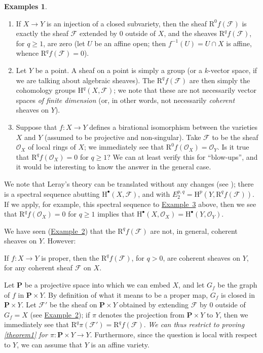 \documentclass{article}
\theoremstyle{plain}
\newenvironment{theorem}[1]
    {\renewcommand\theinnercustomtheorem{#1}\innercustomtheorem}
    {\endinnercustomtheorem}
\theoremstyle{definition}
\newtheorem*{examples}{Examples}
\newcommand{\sh}{\mathscr}
\newcommand{\HH}{\mathrm{H}}
\newcommand{\RR}{\mathrm{R}}
\newcommand{\PP}{\mathbf{P}}
\renewcommand{\geq}{\geqslant}
\newcommand{\oldpage}[1]{\marginpar{\footnotesize$\Big\vert$ \textit{p.~#1}}}
\begin{document}
\begin{examples}
  \begin{enumerate}
    \item If $X\to Y$ is an injection of a closed subvariety, then the sheaf $\RR^0f(\sh{F})$ is exactly the sheaf $\sh{F}$ extended by $0$ outside of $X$, and the sheaves $\RR^qf(\sh{F})$, for $q\geq1$, are zero (let $U$ be an affine open; then $f^{-1}(U)=U\cap X$ is affine, whence $\RR^qf(\sh{F})=0$).
      \label{example1}
    \item Let $Y$ be a point.
      A sheaf on a point is simply a group (or a $k$-vector space, if we are talking about algebraic sheaves).
      The $\RR^qf(\sh{F})$ are then simply the cohomology groups $\HH^q(X,\sh{F})$;
      we note that these are not necessarily vector spaces \emph{of finite dimension} (or, in other words, not necessarily \emph{coherent} sheaves on $Y$).
        \label{example2}
    \item Suppose that $f\colon X\to Y$ defines a birational isomorphism between the varieties $X$ and $Y$ (assumed to be projective and non-singular).
      Take $\sh{F}$ to be the sheaf $\sh{O}_X$ of local rings of $X$;
      we immediately see that $\RR^0f(\sh{O}_X)=\sh{O}_Y$.
      Is it true that $\RR^qf(\sh{O}_X)=0$ for $q\geq1$?
      We can at least verify this for ``blow-ups'', and it would be interesting to know the answer in the general case.
      \label{example3}
  \end{enumerate}
\end{examples}

We note that Leray's theory can be translated without any changes (see \cite{7});
there is a spectral sequence abutting $\HH^\bullet(X,\sh{F})$, and with $E_2^{p,q}=\HH^p(Y,\RR^qf(\sh{F}))$.
If we apply, for example, this spectral sequence
\oldpage{103}
to \hyperref[example3]{Example~3} above, then we see that $\RR^qf(\sh{O}_X)=0$ for $q\geq1$ implies that $\HH^\bullet(X,\sh{O}_X)=\HH^\bullet(Y,\sh{O}_Y)$.

We have seen (\hyperref[example2]{Example~2}) that the $\RR^qf(\sh{F})$ are not, in general, coherent sheaves on $Y$.
However:

\begin{theorem}{1}
\label{theorem1}
  If $f\colon X\to Y$ is proper, then the $\RR^qf(\sh{F})$, for $q>0$, are coherent sheaves on $Y$, for any coherent sheaf $\sh{F}$ on $X$.
\end{theorem}

Let $\PP$ be a projective space into which we can embed $X$, and let $G_f$ be the graph of $f$ in $\PP\times Y$.
By definition of what it means to be a proper map, $G_f$ is closed in $\PP\times Y$.
Let $\sh{F}'$ be the sheaf on $\PP\times Y$ obtained by extending $\sh{F}$ by $0$ outside of $G_f=X$ (see \hyperref[example2]{Example~2});
if $\pi$ denotes the projection from $\PP\times Y$ to $Y$, then we immediately see that $\RR^q\pi(\sh{F}')=\RR^qf(\sh{F})$.
\emph{We can thus restrict to proving \cref{theorem1} for $\pi\colon \PP\times Y\to Y$}.
Furthermore, since the question is local with respect to $Y$, we can assume that $Y$ is an affine variety.
\end{document}
